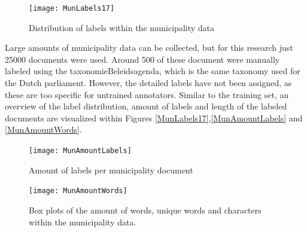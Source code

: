 \begin{figure}[H]
	\begin{center}
		\texttt{[image: MunLabels17]}
		\caption{Distribution of labels within the municipality data}
		\label{fig:MunLabels17}
	\end{center}
\end{figure}

Large amounts of municipality data can be collected, but for this research just 25000 documents were used. Around 500 of these document were manually labeled using the taxonomieBeleidsagenda, which is the same taxonomy used for the Dutch parliament. However, the detailed labels have not been assigned, as these are too specific for untrained annotators. Similar to the training set, an overview of the label distribution, amount of labels and length of the labeled documents are visualized within Figures \ref{MunLabels17},\ref{MunAmountLabels} and \ref{MunAmountWords}. \\

\begin{figure}[H]
	\centering
  	\texttt{[image: MunAmountLabels]}
  	\caption{Amount of labels per municipality document}
  	\label{fig:MunAmountLabels}
\end{figure}

\begin{figure}[H]
	\centering
  	\texttt{[image: MunAmountWords]}
  	\caption{Box plots of the amount of words, unique words and characters within the municipality data.}
  	\label{fig:MunAmountWords}
\end{figure}





